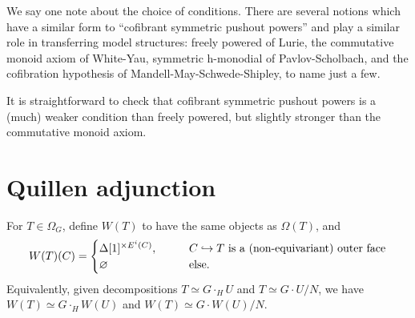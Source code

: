\documentclass[a4paper,10pt
,draft
]{article}%
\renewcommand{\1}{\eta}%
\begin{document}
\begin{remark}
      We say one note about the choice of conditions. There are several notions which have a similar form to
      ``cofibrant symmetric pushout powers'' and play a similar role in transferring model structures:
      freely powered of Lurie,
      the commutative monoid axiom of White-Yau,
      symmetric h-monodial of Pavlov-Scholbach,
      and the cofibration hypothesis of Mandell-May-Schwede-Shipley,
      to name just a few.

      It is straightforward to check that cofibrant symmetric pushout powers is a (much) weaker condition than freely powered,
      but slightly stronger than the commutative monoid axiom.

\end{remark}















\newpage

\section{Quillen adjunction}

\begin{definition}
      For $T \in \Omega_G$,
      define $W(T)$ to have the same objects as $\Omega(T)$, and
      \begin{equation}
            W(T)(C) =
            \begin{cases}
                  \Delta[1]^{\times E^i(C)}, \qquad & C \hookrightarrow T \text{ is a (non-equivariant) outer face}
                  \\
                  \varnothing & \text{else.}
            \end{cases}
      \end{equation}
      Equivalently, given decompositions $T \simeq G \cdot_H U$ and $T \simeq G \cdot U / N$, we have
      $W(T) \simeq G \cdot_H W(U)$ and $W(T) \simeq G \cdot W(U)/N$.
\end{definition}
\end{document}
